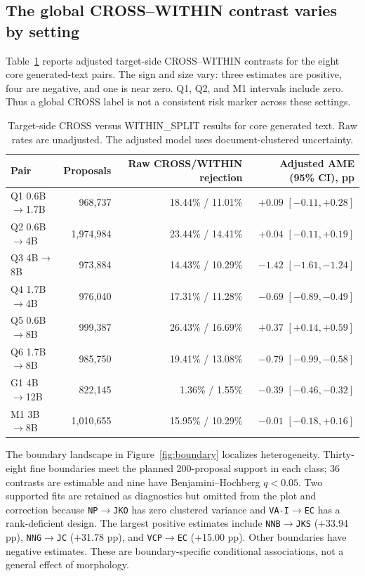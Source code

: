\documentclass[11pt]{article}
\begin{document}
\subsection{The global CROSS--WITHIN contrast varies by setting}

Table~\ref{tab:global} reports adjusted target-side CROSS--WITHIN contrasts
for the eight core generated-text pairs. The sign and size vary: three
estimates are positive, four are negative, and one is near zero. Q1, Q2, and
M1 intervals include zero. Thus a global CROSS label is not a consistent
risk marker across these settings.

\begin{table}[t]
\centering
\small
\begin{tabular}{lrrr}
\toprule
Pair & Proposals & Raw CROSS/WITHIN rejection & Adjusted AME (95\% CI), pp \\
\midrule
Q1 0.6B$\rightarrow$1.7B & 968,737 & 18.44\% / 11.01\% & $+0.09$ $[-0.11,+0.28]$ \\
Q2 0.6B$\rightarrow$4B & 1,974,984 & 23.44\% / 14.41\% & $+0.04$ $[-0.11,+0.19]$ \\
Q3 4B$\rightarrow$8B & 973,884 & 14.43\% / 10.29\% & $-1.42$ $[-1.61,-1.24]$ \\
Q4 1.7B$\rightarrow$4B & 976,040 & 17.31\% / 11.28\% & $-0.69$ $[-0.89,-0.49]$ \\
Q5 0.6B$\rightarrow$8B & 999,387 & 26.43\% / 16.69\% & $+0.37$ $[+0.14,+0.59]$ \\
Q6 1.7B$\rightarrow$8B & 985,750 & 19.41\% / 13.08\% & $-0.79$ $[-0.99,-0.58]$ \\
G1 4B$\rightarrow$12B & 822,145 & 1.36\% / 1.55\% & $-0.39$ $[-0.46,-0.32]$ \\
M1 3B$\rightarrow$8B & 1,010,655 & 15.95\% / 10.29\% & $-0.01$ $[-0.18,+0.16]$ \\
\bottomrule
\end{tabular}
\caption{Target-side CROSS versus WITHIN_SPLIT results for core generated
text. Raw rates are unadjusted. The adjusted model uses document-clustered
uncertainty.}
\label{tab:global}
\end{table}

The boundary landscape in Figure~\ref{fig:boundary} localizes heterogeneity.
Thirty-eight fine boundaries meet the planned 200-proposal support in each
class; 36 contrasts are estimable and nine have Benjamini--Hochberg
$q<0.05$. Two supported fits are retained as diagnostics but omitted from
the plot and correction because \texttt{NP$\rightarrow$JKO} has zero
clustered variance and \texttt{VA-I$\rightarrow$EC} has a rank-deficient
design. The largest positive estimates include
\texttt{NNB$\rightarrow$JKS} (+33.94 pp),
\texttt{NNG$\rightarrow$JC} (+31.78 pp), and
\texttt{VCP$\rightarrow$EC} (+15.00 pp). Other boundaries have negative
estimates. These are boundary-specific conditional associations, not a
general effect of morphology.
\end{document}
